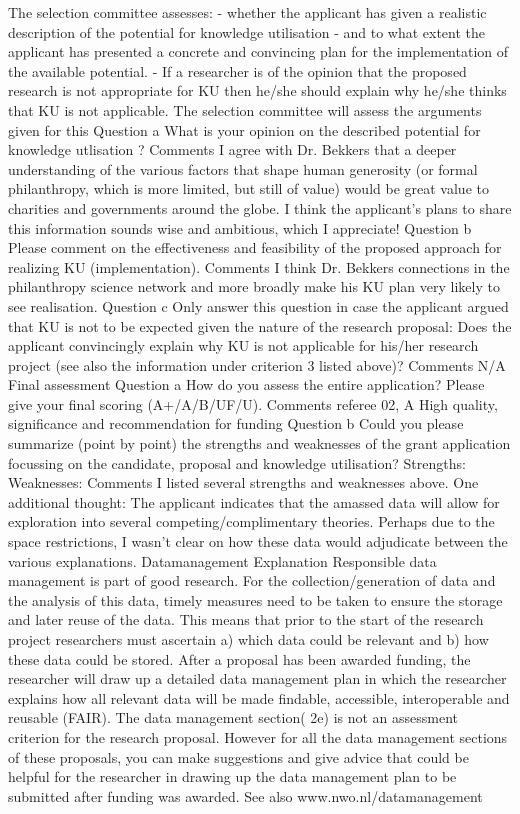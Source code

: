 \documentclass[twocolumn, serif, rga, numeric]{jote-article}
\begin{document}
The selection committee assesses: - whether the applicant has given a realistic description of the potential for knowledge utilisation - and to what extent the applicant has presented a concrete and convincing plan for the implementation of the available potential. - If a researcher is of the opinion that the proposed research is not appropriate for KU then he/she should explain why he/she thinks that KU is not applicable. The selection committee will assess the arguments given for this
Question a
What is your opinion on the described potential for knowledge utlisation ?
Comments
I agree with Dr. Bekkers that a deeper understanding of the various factors that shape human generosity (or formal philanthropy, which is more limited, but still of value) would be great value to charities and governments around the globe. I think the applicant's plans to share this information sounds wise and ambitious, which I appreciate!
Question b
Please comment on the effectiveness and feasibility of the proposed approach for realizing KU (implementation).
Comments
I think Dr. Bekkers connections in the philanthropy science network and more broadly make his KU plan very likely to see realisation.
Question c
Only answer this question in case the applicant argued that KU is not to be expected given the nature of the research proposal: Does the applicant convincingly explain why KU is not applicable for his/her research project (see also the information under criterion 3 listed above)?
Comments
N/A
Final assessment
Question a
How do you assess the entire application? Please give your final scoring (A+/A/B/UF/U).
Comments referee 
02, A High quality, significance and recommendation for funding
Question b
Could you please summarize (point by point) the strengths and weaknesses of the grant application focussing on the candidate, proposal and knowledge utilisation? Strengths:
Weaknesses:
Comments
I listed several strengths and weaknesses above. One additional thought: The applicant indicates that the amassed data will allow for exploration into several competing/complimentary theories. Perhaps due to the space restrictions, I wasn't clear on how these data would adjudicate between the various explanations.
Datamanagement
Explanation
Responsible data management is part of good research. For the collection/generation of data and the analysis of this data, timely measures need to be taken to ensure the storage and later reuse of the data. This means that prior to the start of the research project researchers must ascertain a) which data could be relevant and b) how these data could be stored. After a proposal has been awarded funding, the researcher will draw up a detailed data management plan in which the researcher explains how all relevant data will be made findable, accessible, interoperable and reusable (FAIR). The data management section( 2e) is not an assessment criterion for the research proposal. However for all the data management sections of these proposals, you can make suggestions and give advice that could be helpful for the researcher in drawing up the data management plan to be submitted after funding was awarded. See also www.nwo.nl/datamanagement
\end{document}
